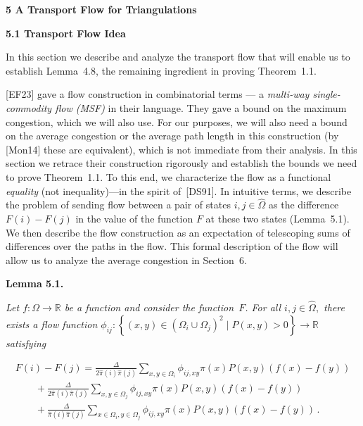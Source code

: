 \documentclass[10pt,a4paper]{article}
\begin{document}
\par\medskip\noindent\textbf{5 A Transport Flow for Triangulations}\par




\par\medskip\noindent\textbf{5.1 Transport Flow Idea}\par




In this section we describe and analyze the transport flow that will enable us to establish Lemma 4.8,
the remaining ingredient in proving Theorem 1.1.\par




[EF23] gave a flow construction in combinatorial terms — a \emph{multi-way single-commodity flow (MSF)} in their language. They gave a bound on the maximum congestion, which we will also use. For our purposes, we will also need a bound on the average congestion or the average path length in this construction (by [Mon14] these are equivalent), which is not immediate from their analysis. In this section we retrace their construction rigorously and establish the bounds we need to prove Theorem 1.1. To this end, we characterize the flow as a functional \emph{equality} (not inequality)—in the spirit of [DS91]. In intuitive terms, we describe the problem of sending flow between a pair of states $i,j\in\hat{\Omega}$ as the difference $F(i)-F(j)$ in the value of the function $F$ at these two states (Lemma 5.1). We then describe the flow construction as an expectation of telescoping sums of differences over the paths in the flow. This formal description of the flow will allow us to analyze the average congestion in Section 6.\par





\par\medskip\noindent\textbf{\textbf{Lemma 5.1}\textbf{.}}\par



\emph{Let $f:\Omega\rightarrow\mathbb{R}$ be a function and consider the function $F$. For all $i,j\in\hat{\Omega},$ there exists a flow function $\phi_{ij}:\left\{(x,y)\in(\Omega_{i}\cup\Omega_{j})^{2}\mid P(x,y)>0\right\}\rightarrow\mathbb{R}$ satisfying}\par




\[\begin{gathered}
\displaystyle F(i)-F(j) \displaystyle=\frac{\Delta}{2\hat{\pi}(i)\hat{\pi}(j)}\sum_{x,y\in\Omega_{i}}\phi_{ij,xy}\pi(x)P(x,y)(f(x)-f(y)) \\
\displaystyle\qquad+\frac{\Delta}{2\hat{\pi}(i)\hat{\pi}(j)}\sum_{x,y\in\Omega_{j}}\phi_{ij,xy}\pi(x)P(x,y)(f(x)-f(y)) \\
\displaystyle\qquad+\frac{\Delta}{\hat{\pi}(i)\hat{\pi}(j)}\sum_{x\in\Omega_{i},y\in\Omega_{j}}\phi_{ij,xy}\pi(x)P(x,y)(f(x)-f(y))\,.
\end{gathered}\]
\end{document}
